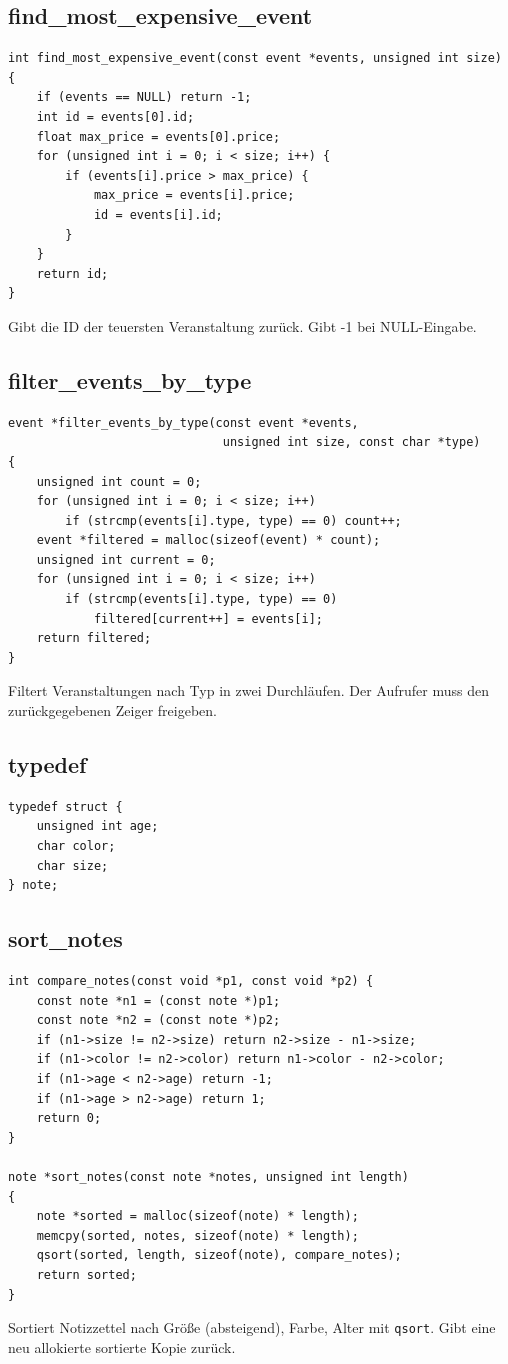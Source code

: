 \documentclass[10pt, a4paper]{article}
\begin{document}
\subsection{find\_most\_expensive\_event}
\begin{lstlisting}
int find_most_expensive_event(const event *events, unsigned int size)
{
    if (events == NULL) return -1;
    int id = events[0].id;
    float max_price = events[0].price;
    for (unsigned int i = 0; i < size; i++) {
        if (events[i].price > max_price) {
            max_price = events[i].price;
            id = events[i].id;
        }
    }
    return id;
}
\end{lstlisting}
Gibt die ID der teuersten Veranstaltung zur\"uck. Gibt -1 bei NULL-Eingabe.

\subsection{filter\_events\_by\_type}
\begin{lstlisting}
event *filter_events_by_type(const event *events,
                              unsigned int size, const char *type)
{
    unsigned int count = 0;
    for (unsigned int i = 0; i < size; i++)
        if (strcmp(events[i].type, type) == 0) count++;
    event *filtered = malloc(sizeof(event) * count);
    unsigned int current = 0;
    for (unsigned int i = 0; i < size; i++)
        if (strcmp(events[i].type, type) == 0)
            filtered[current++] = events[i];
    return filtered;
}
\end{lstlisting}
Filtert Veranstaltungen nach Typ in zwei Durchl\"aufen. Der Aufrufer muss den zur\"uckgegebenen Zeiger freigeben.

\subsection{typedef}
\begin{lstlisting}
typedef struct {
    unsigned int age;
    char color;
    char size;
} note;
\end{lstlisting}

\subsection{sort\_notes}
\begin{lstlisting}
int compare_notes(const void *p1, const void *p2) {
    const note *n1 = (const note *)p1;
    const note *n2 = (const note *)p2;
    if (n1->size != n2->size) return n2->size - n1->size;
    if (n1->color != n2->color) return n1->color - n2->color;
    if (n1->age < n2->age) return -1;
    if (n1->age > n2->age) return 1;
    return 0;
}

note *sort_notes(const note *notes, unsigned int length)
{
    note *sorted = malloc(sizeof(note) * length);
    memcpy(sorted, notes, sizeof(note) * length);
    qsort(sorted, length, sizeof(note), compare_notes);
    return sorted;
}
\end{lstlisting}
Sortiert Notizzettel nach Gr\"o\ss e (absteigend), Farbe, Alter mit \texttt{qsort}. Gibt eine neu allokierte sortierte Kopie zur\"uck.
\end{document}
